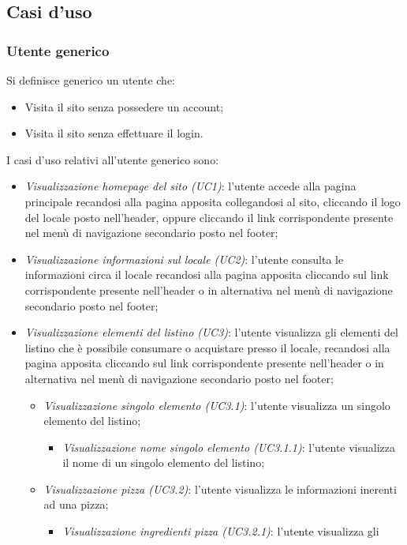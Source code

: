 \subsection{Casi d'uso}
\subsubsection{Utente generico}
Si definisce generico un utente che:
\begin{itemize}
	\item Visita il sito senza possedere un account;
	\item Visita il sito senza effettuare il login.
\end{itemize}
I casi d'uso relativi all'utente generico sono:
\begin{itemize}
	\item \textit{Visualizzazione homepage del sito (UC1)}: l'utente accede alla pagina principale
	recandosi alla pagina apposita collegandosi al sito, cliccando il logo del locale posto nell'header,
	oppure cliccando il link corrispondente presente nel menù di navigazione secondario posto nel footer;
	\item \textit{Visualizzazione informazioni sul locale (UC2)}: l'utente consulta le informazioni circa
	il locale recandosi alla pagina apposita cliccando sul link corrispondente presente nell'header o in
	alternativa nel menù di navigazione secondario posto nel footer;
	\item \textit{Visualizzazione elementi del listino (UC3)}: l'utente visualizza gli elementi del
	listino che è possibile consumare o acquistare presso il locale, recandosi alla pagina apposita
	cliccando sul link corrispondente presente nell'header o in alternativa nel menù di navigazione
	secondario posto nel footer;
	\begin{itemize}
		\item \textit{Visualizzazione singolo elemento (UC3.1)}: l'utente visualizza un singolo elemento
		del listino;
		\begin{itemize}
			\item \textit{Visualizzazione nome singolo elemento (UC3.1.1)}: l'utente visualizza il nome
			di un singolo elemento del listino;
		\end{itemize}
		\item \textit{Visualizzazione pizza (UC3.2)}: l'utente visualizza le informazioni inerenti ad
		una pizza;
		\begin{itemize}
			\item \textit{Visualizzazione ingredienti pizza (UC3.2.1)}: l'utente visualizza gli

\end{itemize}
\end{itemize}
\end{itemize}
